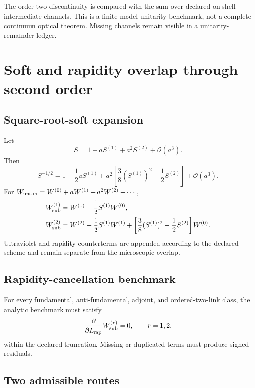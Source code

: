 \documentclass[11pt]{article}
\begin{document}
The order-two discontinuity is compared with the sum over declared on-shell
intermediate channels.  This is a finite-model unitarity benchmark, not a
complete continuum optical theorem.  Missing channels remain visible in a
unitarity-remainder ledger.

\section{Soft and rapidity overlap through second order}
\label{sec:soft2}

\subsection{Square-root-soft expansion}

Let
\begin{equation}
 S=1+aS^{(1)}+a^2S^{(2)}+\mathcal O(a^3).
 \label{eq:soft-series}
\end{equation}
Then
\begin{equation}
 S^{-1/2}
 =1-\frac12aS^{(1)}
 +a^2\left[
 \frac38(S^{(1)})^2-\frac12S^{(2)}
 \right]
 +\mathcal O(a^3).
 \label{eq:soft-sqrt}
\end{equation}
For
\(W_{\rm unsub}=W^{(0)}+aW^{(1)}+a^2W^{(2)}+\cdots\),
\begin{align}
 W_{\rm sub}^{(1)}
 &=W^{(1)}-\frac12S^{(1)}W^{(0)},
 \label{eq:sub1}\\
 W_{\rm sub}^{(2)}
 &=W^{(2)}-\frac12S^{(1)}W^{(1)}
 +\left[
 \frac38(S^{(1)})^2-\frac12S^{(2)}
 \right]W^{(0)}.
 \label{eq:sub2}
\end{align}
Ultraviolet and rapidity counterterms are appended according to the declared
scheme and remain separate from the microscopic overlap.

\subsection{Rapidity-cancellation benchmark}

For every fundamental, anti-fundamental, adjoint, and ordered-two-link class,
the analytic benchmark must satisfy
\begin{equation}
 \frac{\partial}{\partial L_{\rm rap}}
 W_{\rm sub}^{(r)}=0,
 \qquad r=1,2,
 \label{eq:rapidity-cancel}
\end{equation}
within the declared truncation.  Missing or duplicated terms must produce
signed residuals.

\subsection{Two admissible routes}
\end{document}
